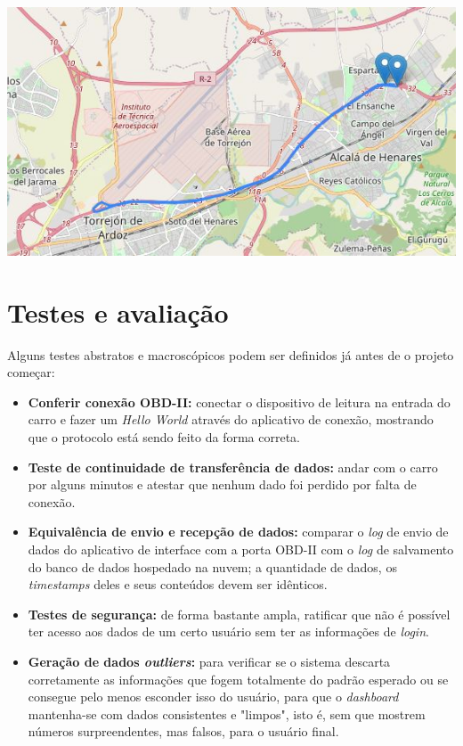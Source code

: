 \begin{center}
         \includegraphics[scale=0.8]         {figures/rota1.JPG}
         \end{center}




\section{Testes e avaliação}
Alguns testes abstratos e macroscópicos podem ser definidos já antes de o projeto começar:

\begin{itemize}
    \item \textbf{Conferir conexão OBD-II:} conectar o dispositivo de leitura na entrada do carro e fazer um \textit{Hello World} através do aplicativo de conexão, mostrando que o protocolo está sendo feito da forma correta.
    
    \item \textbf{Teste de continuidade de transferência de dados:} andar com o carro por alguns minutos e atestar que nenhum dado foi perdido por falta de conexão.
    
    \item \textbf{Equivalência de envio e recepção de dados:} comparar o \textit{log} de envio de dados do aplicativo de interface com a porta OBD-II com o \textit{log} de salvamento do banco de dados hospedado na nuvem; a quantidade de dados, os \textit{timestamps} deles e seus conteúdos devem ser idênticos. 
    
    \item \textbf{Testes de segurança:} de forma bastante ampla, ratificar que não é possível ter acesso aos dados de um certo usuário sem ter as informações de \textit{login}.
    
    \item \textbf{Geração de dados \textit{outliers}:} para verificar se o sistema descarta corretamente as informações que fogem totalmente do padrão esperado ou se consegue pelo menos esconder isso do usuário, para que o \textit{dashboard} mantenha-se com dados consistentes e "limpos", isto é, sem que mostrem números surpreendentes, mas falsos, para o usuário final.
    
\end{itemize}

